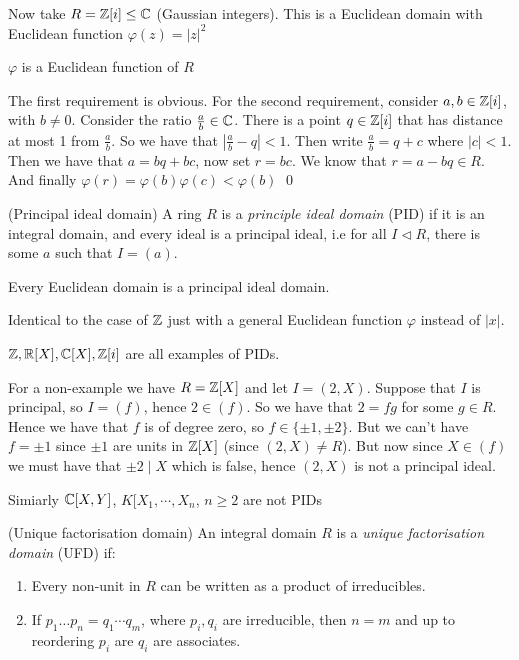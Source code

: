 \documentclass{article}
\newcommand{\nrm}{\triangleleft}
\begin{document}
Now take $ R=\mathbb{Z}[i]\le \mathbb{C} $ (Gaussian integers). This is a Euclidean domain with Euclidean function $ \varphi(z)=|z|^2 $
\begin{claim}
  $\varphi$ is a Euclidean function of $ R $
\end{claim} 
\pf The first requirement is obvious. For the second requirement, consider $ a,b\in\mathbb{Z}[i] $, with $ b\ne 0 $. Consider the ratio $ \frac ab\in \mathbb{C} $. There is a point $ q\in \mathbb{Z}[i] $ that has distance at most 1 from $ \frac ab $. So we have that $ \left|\frac ab - q\right|<1 $. Then write $ \frac ab = q+c $ where $ |c|<1 $. Then we have that $ a=bq+bc $, now set $ r=bc $. We know that $ r=a-bq\in R $. And finally $ \varphi(r)=\varphi(b)\varphi(c)<\varphi(b) $ \qed

\begin{definition}
	(Principal ideal domain) A ring $ R $ is a \textit{principle ideal domain} (PID) if it is an integral domain, and every ideal is a principal ideal, i.e for all $ I\nrm R $, there is some $ a $ such that $ I=(a) $.
\end{definition}
\begin{proposition}
  Every Euclidean domain is a principal ideal domain.
\end{proposition}
\pf Identical to the case of $ \mathbb{Z} $ just with a general Euclidean function $ \varphi $ instead of $ |x| $.
\par
$\mathbb{Z}, \mathbb{R}[X], \mathbb{C}[X], \mathbb{Z}[i] $ are all examples of PIDs.
\par
For a non-example we have $ R=\mathbb{Z}[X] $ and let $ I= (2, X) $. Suppose that $ I $ is principal, so $ I=(f) $, hence $ 2\in (f) $. So we have that $ 2=fg $ for some $ g\in R $. Hence we have that $ f $ is of degree zero, so $ f\in \{\pm 1, \pm 2\} $. But we can't have $ f=\pm 1 $ since $ \pm 1 $ are units in $ \mathbb{Z}[X] $ (since $ (2,X)\ne R $). But now since $ X\in (f) $ we must have that $ \pm 2\mid X $ which is false, hence $ (2,X) $ is not a principal ideal.\par
Simiarly $ \mathbb{C}[X,Y] $, $ K[X_1,\cdots, X_n $, $ n\ge 2 $ are not PIDs
\begin{definition}
	(Unique factorisation domain) An integral domain $ R $ is a \textit{unique factorisation domain} (UFD) if:
	\begin{enumerate}
		\item Every non-unit in $ R $ can be written as a product of irreducibles.
		\item If $ p_1\dots p_n=q_1\cdots q_m $, where $ p_i, q_i $ are irreducible, then $ n=m $ and up to reordering $ p_i $ are $ q_i $ are associates.
	\end{enumerate} 
\end{definition}
\end{document}
